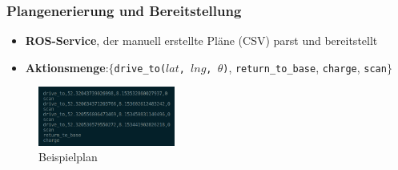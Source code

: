 \documentclass{beamer}
\newcommand{\code}[1]{\colorbox{light-gray}{\texttt{#1}}}
\begin{document}
\begin{frame}
  \frametitle{Plangenerierung und Bereitstellung}
  \begin{itemize}
    \item \textbf{ROS-Service}, der manuell erstellte Pläne (CSV) parst und bereitstellt
    \item \textbf{Aktionsmenge}:\newline $\{$\code{drive\_to($lat$, $lng$, $\theta$)}, \code{return\_to\_base}, \code{charge}, \code{scan}$\}$
  \end{itemize}
  \begin{figure}[H]
    \centering
    \includegraphics[width=0.4\textwidth]{img/plan_example.png}
    \caption*{Beispielplan}
  \end{figure}
\end{frame}
\end{document}
